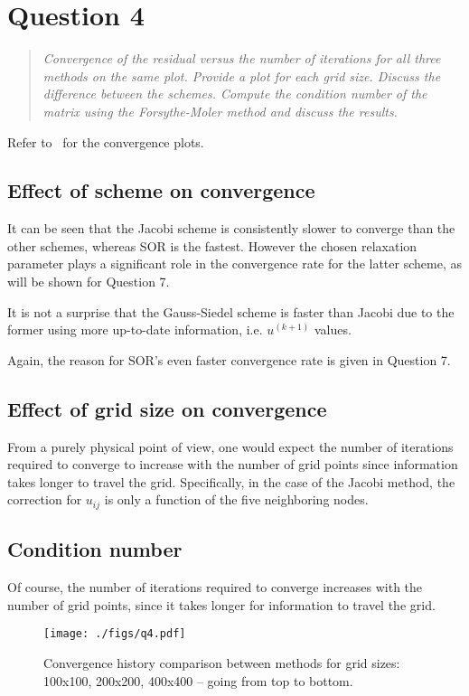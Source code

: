 \documentclass{SelimArticle}
\begin{document}
\section{Question 4}
\begin{quote}
\textit{
    Convergence of the residual versus the number of iterations for all three
    methods on the same plot. Provide a plot for each grid size. Discuss the
    difference between the schemes.  Compute the condition number of the
    matrix using the Forsythe-Moler method and discuss the results.
}
\end{quote}
Refer to~ for the convergence plots.

\subsection{Effect of scheme on convergence}
It can be seen that the Jacobi scheme is consistently slower to converge than the other schemes, whereas
SOR is the fastest. However the chosen relaxation parameter plays a significant role in the convergence rate
for the latter scheme, as will be shown for Question 7.

It is not a surprise that the Gauss-Siedel scheme is faster than Jacobi due to the former using
more up-to-date information, i.e. $u^{(k+1)}$ values.

Again, the reason for SOR's even faster convergence rate is given in Question 7.

\subsection{Effect of grid size on convergence}
From a purely physical point of view, one would expect the number of iterations required to converge
to increase with the number of grid points since information takes longer to travel the grid. Specifically,
in the case of the Jacobi method, the correction for $u_{ij}$ is only a function of the five neighboring
nodes.

\subsection{Condition number}

Of course, the number of iterations required to converge increases with the number of grid points, since it takes longer for information
to travel the grid.
\begin{figure}
    \centering
    \texttt{[image: ./figs/q4.pdf]}
    \caption{Convergence history comparison between methods for grid sizes: 100x100, 200x200, 400x400 -- going from top to bottom.}\label{fig:q4}
\end{figure}
\end{document}
